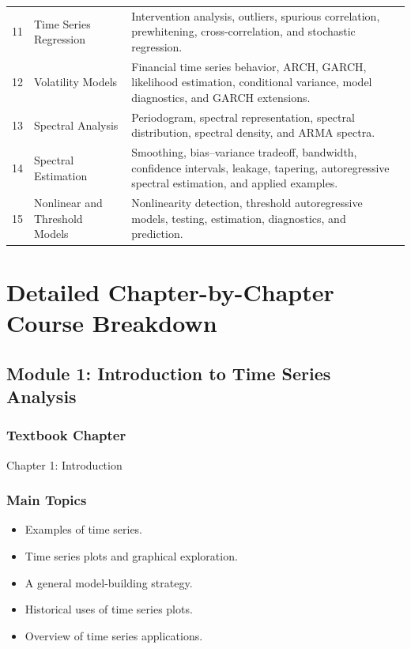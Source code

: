 \documentclass[11pt]{article}
\begin{document}
\begin{longtable}{p{} p{} p{}}
11 & Time Series Regression & Intervention analysis, outliers, spurious correlation, prewhitening, cross-correlation, and stochastic regression. \\

12 & Volatility Models & Financial time series behavior, ARCH, GARCH, likelihood estimation, conditional variance, model diagnostics, and GARCH extensions. \\

13 & Spectral Analysis & Periodogram, spectral representation, spectral distribution, spectral density, and ARMA spectra. \\

14 & Spectral Estimation & Smoothing, bias--variance tradeoff, bandwidth, confidence intervals, leakage, tapering, autoregressive spectral estimation, and applied examples. \\

15 & Nonlinear and Threshold Models & Nonlinearity detection, threshold autoregressive models, testing, estimation, diagnostics, and prediction. \\

\bottomrule
\end{longtable}

\section{Detailed Chapter-by-Chapter Course Breakdown}

\subsection{Module 1: Introduction to Time Series Analysis}

\subsubsection*{Textbook Chapter}
Chapter 1: Introduction

\subsubsection*{Main Topics}
\begin{itemize}
    \item Examples of time series.
    \item Time series plots and graphical exploration.
    \item A general model-building strategy.
    \item Historical uses of time series plots.
    \item Overview of time series applications.
\end{itemize}
\end{document}
